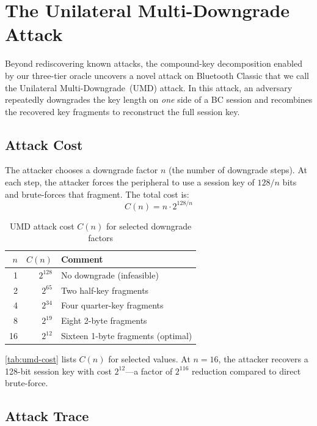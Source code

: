 \section{The Unilateral Multi-Downgrade Attack} \label{sec:umd-attack}

Beyond rediscovering known attacks, the compound-key decomposition enabled by our three-tier oracle uncovers a novel attack on Bluetooth Classic that we call the Unilateral Multi-Downgrade~(UMD) attack.
In this attack, an adversary repeatedly downgrades the key length on \emph{one} side of a BC session and recombines the recovered key fragments to reconstruct the full session key.

\subsection{Attack Cost}

The attacker chooses a downgrade factor $n$ (the number of downgrade steps).
At each step, the attacker forces the peripheral to use a session key of $128/n$ bits and brute-forces that fragment.
The total cost is:
\begin{equation} \label{eq:umd-cost}
    C(n) = n \cdot 2^{128/n}
\end{equation}

\begin{table}[t]
    \centering
    \caption{UMD attack cost $C(n)$ for selected downgrade factors}
    \label{tab:umd-cost}
    \begin{tabular}{rrl}
        \toprule
        $n$ & $C(n)$ & Comment \\
        \midrule
        1 & $2^{128}$ & No downgrade (infeasible) \\
        2 & $2^{65}$ & Two half-key fragments \\
        4 & $2^{34}$ & Four quarter-key fragments \\
        8 & $2^{19}$ & Eight 2-byte fragments \\
        16 & $2^{12}$ & Sixteen 1-byte fragments (optimal) \\
        \bottomrule
    \end{tabular}
\end{table}

\autoref{tab:umd-cost} lists $C(n)$ for selected values.
At $n=16$, the attacker recovers a 128-bit session key with cost $2^{12}$---a factor of $2^{116}$ reduction compared to direct brute-force.

\subsection{Attack Trace}

